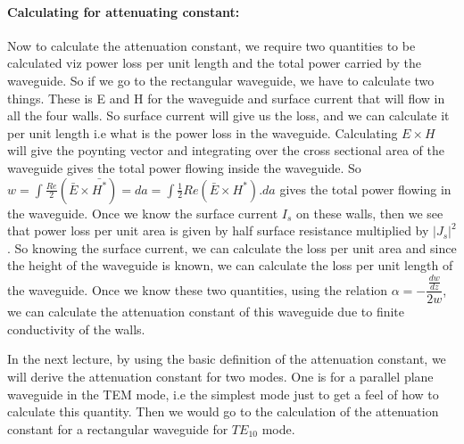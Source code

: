 \paragraph{Calculating for attenuating constant:}
	Now to calculate the attenuation constant, we require two quantities to be calculated viz power loss per unit length and the total power carried by the waveguide. So if we go to the rectangular waveguide, we have to calculate two things. These is E and H for the waveguide and surface current that will flow in all the four walls. So surface current will give us the loss, and we can calculate it per unit length i.e what is the power loss in the waveguide. Calculating $E\times H$ will give the poynting vector and integrating over the cross sectional  area of the waveguide gives the total power flowing inside the waveguide. So $w = \int\frac{Re}{2}(\bar{E}\times\bar{H^*})={da} = \int \frac{1}{2}Re(\bar{E}\times {H}^*).{da}$ gives the total power flowing in  the waveguide. Once we know the surface current $I_{s}$ on these walls, then we see that power loss per unit area is given by half surface resistance multiplied by $|J_{s}|^{2}$. So knowing the surface current, we can calculate the loss per unit area and since the height of the waveguide is known, we can calculate the loss per unit length of the waveguide. Once we know these two quantities, using the relation $\alpha = -\dfrac{\frac{dw}{dz}}{2w}$, we can calculate the attenuation constant of this waveguide due to finite conductivity of the walls.
	
	In the next lecture, by using the basic definition of the attenuation constant, we will derive the attenuation constant for two modes. One is for a parallel plane waveguide in the TEM mode, i.e the simplest mode just to get a feel of how to calculate this quantity. Then we would go to the calculation of the attenuation constant for a rectangular waveguide for $TE_{10}$ mode. 